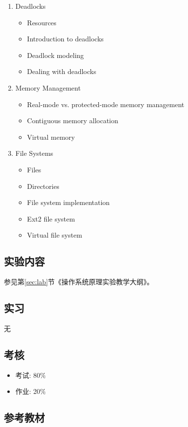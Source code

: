 \documentclass{wx672article}
\begin{document}
\begin{enumerate}
\item Deadlocks
  \begin{itemize}
  \item Resources
  \item Introduction to deadlocks
  \item Deadlock modeling
  \item Dealing with deadlocks
  \end{itemize}
\item Memory Management
  \begin{itemize}
  \item Real-mode vs. protected-mode memory management
  \item Contiguous memory allocation
  \item Virtual memory
  \end{itemize}
\item File Systems
  \begin{itemize}
  \item Files
  \item Directories
  \item File system implementation
  \item Ext2 file system
  \item Virtual file system
  \end{itemize}
\end{enumerate}

\subsection{实验内容}
\label{sec-1-2}

参见第\ref{sec:lab}节《操作系统原理实验教学大纲》。

\subsection{实习}
\label{sec-1-3}

无

\subsection{考核}
\label{sec-1-4}

\begin{itemize}
\item 考试: 80\%
\item 作业: 20\%
\end{itemize}

\subsection{参考教材}
\label{sec-1-5}
\end{document}

